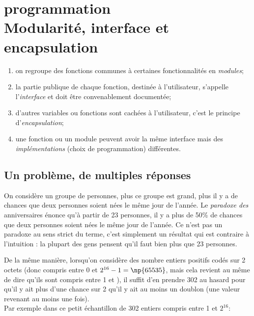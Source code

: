 \documentclass[a4paper,12pt,french]{book}
\begin{document}
\chapter{\large programmation\\[-1em]\fontsize{35pt}{42pt}\selectfont\titlefont Modularité, interface et encapsulation}


\begin{aretenir}
\begin{enumerate}[--]
	\item 	on regroupe des fonctions communes à certaines fonctionnalités en \textit{modules};
	\item 	la partie publique de chaque fonction, destinée à l'utilisateur, s'appelle l'\textit{interface}  et doit être convenablement documentée;
	\item 	d'autres variables ou fonctions sont cachées à l'utilisateur, c'est le principe d'\textit{encapsulation};
	\item 	une fonction ou un module peuvent avoir la même interface mais des \textit{implémentations} (choix de programmation) différentes.

\end{enumerate}
\end{aretenir}
\section{Un problème, de multiples réponses}
On considère un groupe de personnes, plus ce groupe est grand, plus il y a de chances que deux personnes soient nées le même jour de l'année. Le \textit{paradoxe des} anniversaires énonce qu'à partir de 23 personnes, il y a plus de 50\% de chances que deux personnes soient nées le même jour de l'année. Ce n'est pas un paradoxe au sens strict du terme, c'est simplement un résultat qui est contraire à l'intuition : la plupart des gens pensent qu'il faut bien plus que 23 personnes.

De la même manière, lorsqu'on considère des nombre entiers positifs codés sur 2 octets (donc compris entre 0 et $2^{16}-1=\np{65535}$, mais cela revient au même de dire qu'ils sont compris entre 1 et ), il suffit d'en prendre 302 au hasard pour qu'il y ait plus d'une chance sur 2 qu'il y ait au moins un doublon (une valeur revenant au moins une fois).\\
Par exemple dans ce petit échantillon de 302 entiers compris entre 1 et $2^{16}$:\\
\end{document}

